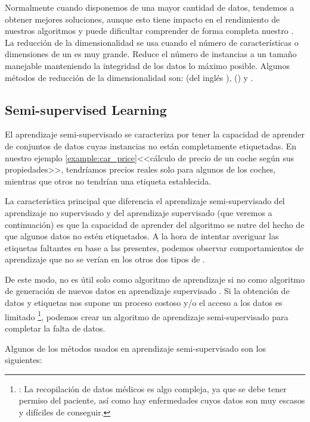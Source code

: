 Normalmente cuando disponemos de una mayor cantidad de datos, tendemos a obtener mejores soluciones, aunque esto tiene impacto en el rendimiento de nuestros algoritmos y puede dificultar comprender de forma completa nuestro .
La reducción de la dimensionalidad se usa cuando el número de características o dimensiones de un  es muy grande. Reduce el número de instancias a un tamaño manejable manteniendo la integridad de los datos lo máximo posible. Algunos métodos de reducción de la dimensionalidad son:  (del inglés ),  () y .

\subsection{Semi-supervised Learning}

El aprendizaje semi-supervisado se caracteriza por tener la capacidad de aprender de conjuntos de datos cuyas instancias no están completamente etiquetadas. En nuestro ejemplo \ref{example:car_price}<<cálculo de precio de un coche según sus propiedades>>, tendríamos precios reales solo para algunos de los coches, mientras que otros no tendrían una etiqueta establecida.

La característica principal que diferencia el aprendizaje semi-supervisado del aprendizaje no supervisado y del aprendizaje supervisado (que veremos a continuación) es que la capacidad de aprender del algoritmo se nutre del hecho de que algunos datos no estén etiquetados. A la hora de intentar averiguar las etiquetas faltantes en base a las presentes, podemos observar comportamientos de aprendizaje que no se verían en los otros dos tipos de .

De este modo, no es útil solo como algoritmo de aprendizaje si no como algoritmo de generación de nuevos datos en aprendizaje supervisado . Si la obtención de datos y etiquetas nos supone un proceso costoso y/o el acceso a los datos es limitado \footnote{\pe: La recopilación de datos médicos es algo compleja, ya que se debe tener permiso del paciente, así como hay enfermedades cuyos datos son muy escasos y difíciles de conseguir.}, podemos crear un algoritmo de aprendizaje semi-supervisado para completar la falta de datos.

Algunos de los métodos usados en aprendizaje semi-supervisado son los siguientes:

